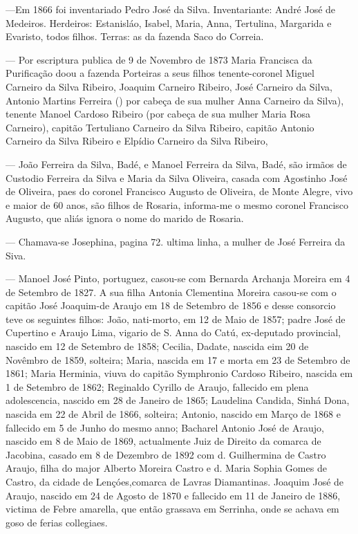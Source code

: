 —Em 1866 foi inventariado Pedro José da Silva. Inventariante: André José de Medeiros. Herdeiros: Estanisláo, Isabel, Maria, Anna, Tertulina, Margarida e Evaristo, todos filhos. Terras: as da fazenda Saco do Correia.

— Por escriptura publica de 9 de Novembro de 1873 Maria Francisca da Purificação doou a fazenda Porteiras a seus filhos tenente-coronel Miguel Carneiro da Silva Ribeiro, Joaquim Carneiro Ribeiro, José Carneiro da Silva, Antonio Martins Ferreira () por cabeça de sua mulher Anna Carneiro da Silva), tenente Manoel Cardoso Ribeiro (por cabeça de sua mulher Maria Rosa Carneiro), capitão Tertuliano Carneiro da Silva Ribeiro, capitão Antonio Carneiro da Silva Ribeiro e Elpídio Carneiro da Silva Ribeiro,

— João Ferreira da Silva, Badé, e Manoel Ferreira da Silva, Badé, são irmãos de Custodio Ferreira da Silva e Maria da Silva Oliveira, casada com Agostinho José de Oliveira, paes do coronel Francisco Augusto de Oliveira, de Monte Alegre, vivo e maior de 60 anos, são filhos de Rosaria, informa-me o mesmo coronel Francisco Augusto, que aliás ignora o nome do marido de Rosaria.

— Chamava-se Josephina, pagina 72. ultima linha, a mulher de José Ferreira da Siva.

— Manoel José Pinto, portuguez, casou-se com Bernarda Archanja Moreira em 4 de Setembro de 1827. A sua filha Antonia Clementina Moreira casou-se com o capitão José Joaquim-de Araujo em 18 de Setembro de 1856 e desse consorcio teve os seguintes filhos: João, nati-morto, em 12 de Maio de 1857; padre José de Cupertino e Araujo Lima, vigario de S. Anna do Catú, ex-deputado provincial, nascido em 12 de Setembro de 1858; Cecilia, Dadate, nascida eim 20 de Novêmbro de 1859, solteira; Maria, nascida em 17 e morta em 23 de Setembro de 1861; Maria Herminia, viuva do capitão Symphronio Cardoso Ribeiro, nascida em 1 de Setembro de 1862; Reginaldo Cyrillo de Araujo, fallecido em plena adolescencia, nascido em 28 de Janeiro de 1865; Laudelina Candida, Sinhá Dona, nascida em 22 de Abril de 1866, solteira; Antonio, nascido em Março de 1868 e fallecido em 5 de Junho do mesmo anno; Bacharel Antonio José de Araujo, nascido em 8 de Maio de 1869, actualmente Juiz de Direito da comarca de Jacobina, casado em 8 de Dezembro de 1892 com d. Guilhermina de Castro Araujo, filha do major Alberto Moreira Castro e d. Maria Sophia Gomes de Castro, da cidade de Lençóes,comarca de Lavras Diamantinas. Joaquim José de Araujo, nascido em 24 de Agosto de 1870 e fallecido em 11 de Janeiro de 1886, victima de Febre amarella, que então grassava em Serrinha, onde se achava em goso de ferias collegiaes. 


